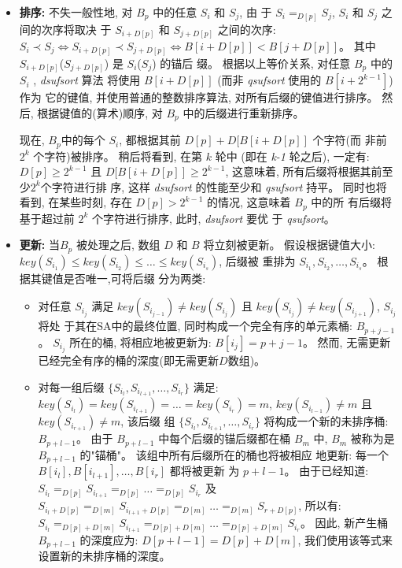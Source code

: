 \begin{itemize}
\item \textbf{排序:} 不失一般性地, 对 $B_p$ 中的任意 $S_i$ 和 $S_j$, 由
  于 $S_i =_{D[p]} S_j$, $S_i$ 和 $S_j$ 之间的次序将取决
  于 $S_{i+D[p]}$ 和 $S_{j+D[p]}$ 之间的次序:
  $S_i \prec S_j \iff S_{i+D[p]} \prec S_{j+D[p]} \iff B[i+D[p]] <
  B[j+D[p]]$。 其中 $S_{i+D[p]}$($S_{j+D[p]}$) 是 $S_i$($S_j$) 的锚后
  缀。 根据以上等价关系, 对任意 $B_p$ 中的 $S_i$ , \emph{dsufsort} 算法
  将使用 $B[i+D[p]]$ (而非 \emph{qsufsort} 使用的 $B[i+2^{k-1}]$) 作为
  它的键值, 并使用普通的整数排序算法, 对所有后缀的键值进行排序。 然后,
  根据键值的(算术)顺序, 对 $B_p$ 中的后缀进行重新排序。

  现在, $B_p$中的每个 $S_i$, 都根据其前 $D[p] + D[B[i+D[p]]$ 个字符(而
  非前 $2^k$ 个字符)被排序。 稍后将看到, 在第 $k$ 轮中 (即在 \emph{k-1}
  轮之后), 一定有: $D[p] \geq 2^{k-1}$ 且 $D[B[i+D[p]] \geq 2^{k-1}$,
  这意味着, 所有后缀将根据其前至少$2^k$个字符进行排
  序, 这样 \emph{dsufsort} 的性能至少和 \emph{qsufsort} 持平。 同时也将
  看到, 在某些时刻, 存在 $D[p] > 2^{k-1}$ 的情况, 这意味着 $B_p$ 中的所
  有后缀将基于超过前 $2^k$ 个字符进行排序, 此时, \emph{dsufsort} 要优
  于 \emph{qsufsort}。

\item \textbf{更新:} 当$B_p$ 被处理之后, 数组 $D$ 和 $B$ 将立刻被更新。
  假设根据键值大小:
  $key(S_{i_1}) \leq key(S_{i_2}) \leq \dots \leq key(S_{i_s})$, 后缀被
  重排为 $S_{i_1}, S_{i_2},\dots,S_{i_s}$。 根据其键值是否唯一,可将后缀
  分为两类:

\begin{itemize}

\item 对任意 $S_{i_j}$ 满足 $key(S_{i_{j-1}}) \neq
  key(S_{i_j})$ 且 $key(S_{i_j}) \neq key(S_{i_{j+1}})$, $S_{i_j}$ 将处
  于其在SA中的最终位置, 同时构成一个完全有序的单元素桶:
  $B_{p+j-1}$。 $S_{i_j}$ 所在的桶, 将相应地被更新为: $B[i_j] = p+j-1$。
  然而, 无需更新已经完全有序的桶的深度(即无需更新$D$数组)。

\item 对每一组后缀 $\{S_{i_l}, S_{i_{l+1}},\dots,S_{i_r}\}$ 满足:
  $key(S_{i_l}) = key(S_{i_{l+1}}) = \dots = key(S_{i_r}) = m$,
  $key(S_{i_{l-1}}) \neq m$ 且 $key(S_{i_{r+1}}) \neq m$, 该后缀
  组 $\{S_{i_l}, S_{i_{l+1}},\dots,S_{i_r}\}$ 将构成一个新的未排序桶:
  $B_{p+l-1}$。 由于 $B_{p+l-1}$ 中每个后缀的锚后缀都在桶 $B_m$ 中,
  $B_m$ 被称为是 $B_{p+l-1}$ 的"锚桶"。 该组中所有后缀所在的桶也将被相应
  地更新: 每一个 $B[i_l], B[i_{l+1}], \dots, B[i_r]$ 都将被更新
  为 $p+l-1$。  由于已经知道:
  $S_{i_l} =_{D[p]} S_{i_{l+1}} =_{D[p]} \dots =_{D[p]}
  S_{i_r}$ 及
  $S_{i_l+D[p]} =_{D[m]} S_{i_{l+1}+D[p]} =_{D[m]} \dots =_{D[m]}
  S_{r+D[p]}$, 所以有:
  $S_{i_l} =_{D[p]+D[m]} S_{i_{l+1}} =_{D[p]+D[m]} \dots =_{D[p]+D[m]}
  S_{i_r}$。  因此, 新产生桶 $B_{p+l-1}$ 的深度应为: $D[p+l-1] = D[p] +
  D[m]$, 我们使用该等式来设置新的未排序桶的深度。
\end{itemize}

\end{itemize}


